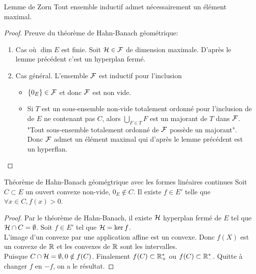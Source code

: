 \documentclass[]{report}
\begin{document}
    \begin{lm}{Lemme de Zorn}{}
        Tout ensemble inductif admet nécessairement un élément maximal.
    \end{lm}

    \begin{proof}
        Preuve du théorème de Hahn-Banach géométrique:
        \begin{enumerate}
            \item Cas où $\dim E$ est finie. Soit $\mathcal{H}\in \mathcal{F}$ de dimension maximale. D'après le lemme précédent c'est un hyperplan fermé.
            \item Cas général. L'ensemble $\mathcal{F}$ est inductif pour l'inclusion
            \begin{itemize}
                \item $\{0_E\}\in \mathcal{F}$ et donc $\mathcal{F}$ est non vide.
                \item Si $T$ est un sous-ensemble non-vide totalement ordonné pour l'inclusion de \sevs de $E$ ne contenant pas $C$, alors $\bigcup_{F\in T}F$ est un majorant de $T$ dans $\mathcal{F}$.\\
                "Tout sous-ensemble totalement ordonné de $\mathcal{F}$ possède un majorant". Donc $\mathcal{F}$ admet un élément maximal qui d'après le lemme précédent est un hyperflan.
            \end{itemize}
        \end{enumerate}
    \end{proof}

    \begin{cor}{Théorème de Hahn-Banach géomégtrique avec les formes linéaires continues}{}
        Soit $C\subset E$ un ouvert convexe non-vide, $0_E\notin C$. Il existe $f\in E'$ telle que $\forall x\in C,f(x)>0$.
    \end{cor}

    \begin{proof}
        Par le théorème de Hahn-Banach, il existe $\mathcal{H}$ hyperplan fermé de $E$ tel que $\mathcal{H}\cap C=\emptyset$. Soit $f\in E'$ tel que $\mathcal{H}=\ker f$.\\
        L'image d'un convexe par une application affine est un convexe. Donc $f(X)$ est un convexe de $\mathbb{R}$ et les convexes de $\mathbb{R}$ sont les intervalles.\\
        Puisque $C\cap \mathcal{H}=\emptyset, 0\notin f(C)$. Finalement $f(C)\subset \mathbb{R}^*_+$ ou $f(C)\subset \mathbb{R}_-^*$. Quitte à changer $f$ en $-f$, on a le résultat.
    \end{proof}
\end{document}
